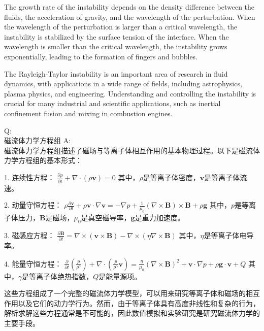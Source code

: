 \documentclass[12pt, a4paper, oneside]{article}
\begin{document}
\begin{spacing}{2.0}
The growth rate of the instability depends on the density difference between the fluids, the acceleration of gravity, 
and the wavelength of the perturbation. When the wavelength of the perturbation is larger than a critical wavelength, 
the instability is stabilized by the surface tension of the interface. When the wavelength is smaller than the critical wavelength, 
the instability grows exponentially, leading to the formation of fingers and bubbles.

The Rayleigh-Taylor instability is an important area of research in fluid dynamics, with applications in a wide range of fields, 
including astrophysics, plasma physics, and engineering. Understanding and controlling the instability is crucial for many industrial 
and scientific applications, such as inertial confinement fusion and mixing in combustion engines.

Q:\\
磁流体力学方程组
A:\\
磁流体力学方程组描述了磁场与等离子体相互作用的基本物理过程。以下是磁流体力学方程组的基本形式：

1. 连续性方程：
$\displaystyle \frac{\partial \rho}{\partial t} + \nabla \cdot (\rho \mathbf{v}) = 0$
其中，$\rho$是等离子体密度，$\mathbf{v}$是等离子体流速。

2. 动量守恒方程：
$\displaystyle \rho \frac{\partial \mathbf{v}}{\partial t} + \rho \mathbf{v} \cdot \nabla \mathbf{v} = -\nabla p + \frac{1}{\mu_0}(\nabla \times \mathbf{B}) \times \mathbf{B} + \rho \mathbf{g}$
其中，$p$是等离子体压力，$\mathbf{B}$是磁场，$\mu_0$是真空磁导率，$\mathbf{g}$是重力加速度。

3. 磁感应方程：
$\displaystyle \frac{\partial \mathbf{B}}{\partial t} = \nabla \times (\mathbf{v} \times \mathbf{B}) - \nabla \times (\eta \nabla \times \mathbf{B})$
其中，$\eta$是等离子体电导率。

4. 能量守恒方程：
$\displaystyle \frac{\partial}{\partial t} (\frac{p}{\rho^\gamma}) + \nabla \cdot (\frac{p}{\rho^\gamma} \mathbf{v}) = \frac{\eta}{\mu_0} (\nabla \times \mathbf{B})^2 + \mathbf{v} \cdot \nabla p + \rho \mathbf{g} \cdot \mathbf{v} + Q$
其中，$\gamma$是等离子体绝热指数，$Q$是能量源项。

这些方程组成了一个完整的磁流体力学模型，可以用来研究等离子体和磁场的相互作用以及它们的动力学行为。然而，由于等离子体具有高度非线性和复杂的行为，解析求解这些方程通常是不可能的，因此数值模拟和实验研究是研究磁流体力学的主要手段。


\end{spacing}{}
\end{document}
